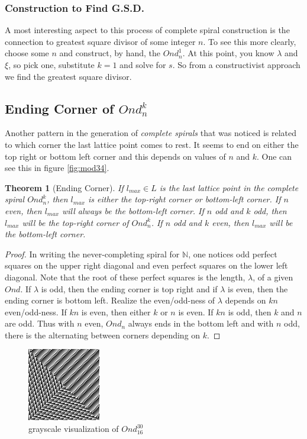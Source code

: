 \documentclass[11pt]{amsart}
\theoremstyle{mydef}
\newtheorem{thm}{Theorem}[section]
\begin{document}
\subsubsection{Construction to Find G.S.D.}
A most interesting aspect to this process of complete spiral construction is the connection to greatest square divisor of some integer $n$. To see this more clearly, choose some $n$ and construct, by hand, the $Ond^1_n$. At this point, you know $\lambda$ and $\xi$, so pick one, substitute $k = 1$ and solve for $s$. So from a constructivist approach we find the greatest square divisor.

\subsection{Ending Corner of $Ond^k_n$}

Another pattern in the generation of \textit{complete spirals} that was noticed is related to which corner the last lattice point comes to rest. It seems to end on either the top right or bottom left corner and this depends on values of $n$ and $k$. One can see this in figure \ref{fig:mod34}. 

\begin{thm}[Ending Corner]
If $l_{max} \in L$ is the last lattice point in the complete spiral $Ond^k_n$, then $l_{max}$ is either the top-right corner or bottom-left corner. If $n$ even, then $l_{max}$ will always be the bottom-left corner. If $n$ odd and $k$ odd, then $l_{max}$ will be the top-right corner of $Ond^k_n$. If $n$ odd and $k$ even, then $l_{max}$ will be the bottom-left corner.
\end{thm}

\begin{proof}
In writing the never-completing spiral for $\mathbb{N}$, one notices odd perfect squares on the upper right diagonal and even perfect squares on the lower left diagonal. Note that the root of these perfect squares is the length, $\lambda$, of a given $Ond$. If $\lambda$ is odd, then the ending corner is top right and if $\lambda$ is even, then the ending corner is bottom left. Realize the even/odd-ness of $\lambda$ depends on $kn$ even/odd-ness. If $kn$ is even, then either $k$ or $n$ is even. If $kn$ is odd, then $k$ and $n$ are odd. Thus with $n$ even, $Ond_n$ always ends in the bottom left and with $n$ odd, there is the alternating between corners depending on $k$.
\end{proof}

\begin{figure}
\centering
\includegraphics[scale=1]{spN16k30b.png}
\caption{grayscale visualization of $Ond^{30}_{16}$}
\label{fig:viz1630}
\end{figure}
\end{document}
